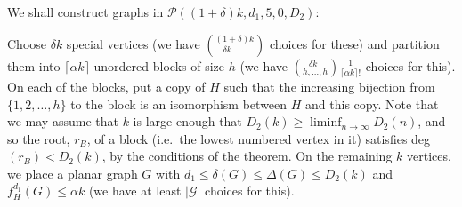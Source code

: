 \documentclass{article}
\newtheorem{Proof of Theorem}{Proof of Theorem}
\begin{document}
We shall construct graphs in $\mathcal{P}((1+\delta)k,d_{1},5,0,D_{2})$:

Choose $\delta k$ special vertices 
(we have $\left(^{(1+\delta)k} _{\phantom{qq} \delta k} \right)$ choices for these)
and partition them into $\lceil \alpha k \rceil$ unordered blocks of size $h$
(we have $\left(^{\phantom{w} \delta k} _{h, \ldots, h} \right) \frac{1}{\lceil \alpha k \rceil !}$ choices for this).
On each of the blocks,
put a copy of $H$ such that the increasing bijection from $\{ 1,2, \ldots, h \}$ to the block
is an isomorphism between $H$ and this copy.
Note that we may assume that $k$ is large enough that $D_{2}(k) \geq \liminf_{n \to \infty}D_{2}(n)$,
and so the root, $r_{B}$, of a block
(i.e.~the lowest numbered vertex in it)
satisfies deg$(r_{B})<D_{2}(k)$,
by the conditions of the theorem. 
On the remaining $k$ vertices,
we place a planar graph $G$ with 
$d_{1} \leq \delta(G) \leq \Delta(G) \leq D_{2}(k)$
and $f_{H}^{d_{1}}(G) \leq \alpha k$
(we have at least $|\mathcal{G}|$ choices for this).
\end{document}

